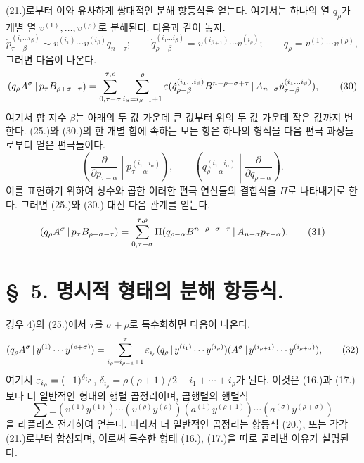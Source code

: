 (21.)로부터 이와 유사하게 쌍대적인 분해 항등식을 얻는다. 여기서는 하나의 열 $q_\rho$가 개별 열 $v^{(1)},\ldots,v^{(\rho)}$로 분해된다. 다음과 같이 놓자.
\begin{equation}
 \dot p_{\tau-\beta}^{(i_1\ldots i_\beta)}\sim v^{(i_1)}\cdots v^{(i_\beta)}q_{n-\tau};\qquad
 \dot q_{\rho-\beta}^{(i_1\ldots i_\beta)}=v^{(i_{\beta+1})}\cdots v^{(i_\rho)};\qquad
 q_\rho=v^{(1)}\cdots v^{(\rho)},
\tag{29}
\end{equation}
그러면 다음이 나온다.
\begin{equation}
 (q_\rho A^\sigma\,|\,p_\tau B_{\rho+\sigma-\tau})
 =\sum_{\substack{0,\tau-\sigma}}^{\substack{\tau,\rho}}
   \sum_{i_\beta=i_{\beta-1}+1}^{\rho}\varepsilon
(\dot q_{\rho-\beta}^{(i_1\ldots i_\beta)}B^{n-\rho-\sigma+\tau}\,|\,A_{n-\sigma}\dot p_{\tau-\beta}^{(i_1\ldots i_\beta)}) ,
\tag{30}
\end{equation}
여기서 합 지수 $\beta$는 아래의 두 값 가운데 큰 값부터 위의 두 값 가운데 작은 값까지 변한다. (25.)와 (30.)의 한 개별 합에 속하는 모든 항은 하나의 형식을 다음 편극 과정들로부터 얻은 편극들이다.
\[
\left(\frac{\partial}{\partial p_{\tau-\alpha}}\middle|p_{\tau-\alpha}^{(i_1\ldots i_\alpha)}\right),\qquad
\left(q_{\rho-\alpha}^{(i_1\ldots i_\alpha)}\middle|\frac{\partial}{\partial q_{\rho-\alpha}}\right).
\]
이를 표현하기 위하여 상수와 곱한 이러한 편극 연산들의 결합식을 $\Pi$로 나타내기로 한다. 그러면 (25.)와 (30.) 대신 다음 관계를 얻는다.
\begin{equation}
 (q_\rho A^\sigma\,|\,p_\tau B_{\rho+\sigma-\tau})
 =\sum_{\substack{0,\tau-\sigma}}^{\substack{\tau,\rho}}
 \Pi(q_{\rho-\alpha}B^{n-\rho-\sigma+\tau}\,|\,A_{n-\sigma}p_{\tau-\alpha}).
\tag{31}
\end{equation}

\section*{\S\ 5. 명시적 형태의 분해 항등식.}
경우 4)의 (25.)에서 $\tau$를 $\sigma+\rho$로 특수화하면 다음이 나온다.
\begin{equation}
 (q_\rho A^\sigma\,|\,y^{(1)}\cdots y^{(\rho+\sigma)})
 =\sum_{i_\rho=i_{\rho-1}+1}^{\tau}
 \varepsilon_{i_\rho}(q_\rho\,|\,y^{(i_1)}\cdots y^{(i_\rho)})
 (A^\sigma\,|\,y^{(i_{\rho+1})}\cdots y^{(i_{\rho+\sigma})}),
\tag{32}
\end{equation}
여기서 $\varepsilon_{i_\rho}=(-1)^{\delta_{i_\rho}}$, $\delta_{i_\rho}=\rho(\rho+1)/2+i_1+\cdots+i_\rho$가 된다. 이것은 (16.)과 (17.)보다 더 일반적인 형태의 행렬 곱정리이며, 곱행렬의 행렬식
\[
 \sum\pm(v^{(1)}y^{(1)})\cdots(v^{(\rho)}y^{(\rho)})(a^{(1)}y^{(\rho+1)})\cdots(a^{(\sigma)}y^{(\rho+\sigma)})
\]
을 라플라스 전개하여 얻는다. 따라서 더 일반적인 곱정리는 항등식 (20.), 또는 각각 (21.)로부터 합성되며, 이로써 특수한 형태 (16.), (17.)을 따로 골라낸 이유가 설명된다.

